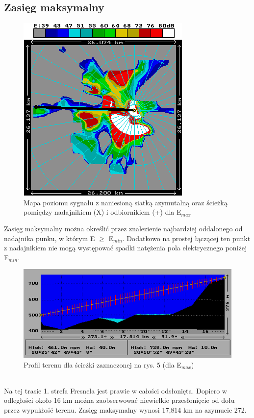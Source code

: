\documentclass[12pt, a4paper, oneside]{article}
\begin{document}
\subsection{Zasięg maksymalny}
\begin{figure}[h!]
\centering
\includegraphics[scale=1.1]{pics/mapki/f4.png}
\caption{Mapa poziomu sygnału z naniesioną siatką azymutalną oraz ścieżką pomiędzy nadajnikiem (X) i odbiornikiem (+) dla E$_{max}$}
\end{figure}
\indent Zasięg maksymalny można określić przez znalezienie najbardziej oddalonego od nadajnika punku, w którym E $\geq$ E$_{min}$. Dodatkowo na prostej łączącej ten punkt z nadajnikiem nie mogą występować spadki natężenia pola elektrycznego poniżej E$_{min}$.
\begin{figure}[h!]
\centering
\includegraphics[scale=1.1]{pics/mapki/f5.png}
\caption{Profil terenu dla ścieżki zaznaczonej na rys. 5 (dla E$_{max}$)}
\end{figure}\\
\indent Na tej trasie 1. strefa Fresnela jest prawie w całości odsłonięta. Dopiero w odległości około 16 km można zaobserwować niewielkie przesłonięcie od dołu przez wypukłość terenu. Zasięg maksymalny wynosi 17,814 km na azymucie 272\textdegree.
\clearpage
\end{document}

